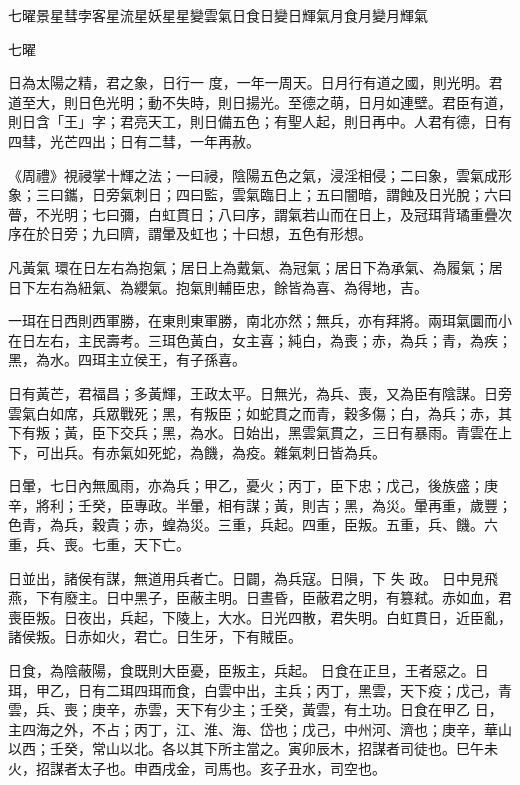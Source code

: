 
\begin{pinyinscope}

 七曜景星彗孛客星流星妖星星變雲氣日食日變日輝氣月食月變月輝氣



 七曜



 日為太陽之精，君之象，日行一
 度，一年一周天。日月行有道之國，則光明。君道至大，則日色光明；動不失時，則日揚光。至德之萌，日月如連壁。君臣有道，則日含「王」字；君亮天工，則日備五色；有聖人起，則日再中。人君有德，日有四彗，光芒四出；日有二彗，一年再赦。



 《周禮》視祲掌十輝之法；一曰祲，陰陽五色之氣，浸淫相侵；二曰象，雲氣成形象；三曰鑴，日旁氣刺日；四曰監，雲氣臨日上；五曰闇暗，謂蝕及日光脫；六曰瞢，不光明；七曰彌，白虹貫日；八曰序，謂氣若山而在日上，及冠珥背璚重疊次序在於日旁；九曰隮，謂暈及虹也；十曰想，五色有形想。



 凡黃氣
 環在日左右為抱氣；居日上為戴氣、為冠氣；居日下為承氣、為履氣；居日下左右為紐氣、為纓氣。抱氣則輔臣忠，餘皆為喜、為得地，吉。



 一珥在日西則西軍勝，在東則東軍勝，南北亦然；無兵，亦有拜將。兩珥氣圜而小在日左右，主民壽考。三珥色黃白，女主喜；純白，為喪；赤，為兵；青，為疾；黑，為水。四珥主立侯王，有子孫喜。



 日有黃芒，君福昌；多黃輝，王政太平。日無光，為兵、喪，又為臣有陰謀。日旁雲氣白如席，兵眾戰死；黑，有叛臣；如蛇貫之而青，穀多傷；白，為兵；赤，其下有叛；黃，臣下交兵；黑，為水。日始出，黑雲氣貫之，三日有暴雨。青雲在上下，可出兵。有赤氣如死蛇，為饑，為疫。雜氣刺日皆為兵。



 日暈，七日內無風雨，亦為兵；甲乙，憂火；丙丁，臣下忠；戊己，後族盛；庚辛，將利；壬癸，臣專政。半暈，相有謀；黃，則吉；黑，為災。暈再重，歲豐；色青，為兵，穀貴；赤，蝗為災。三重，兵起。四重，臣叛。五重，兵、饑。六重，兵、喪。七重，天下亡。



 日並出，諸侯有謀，無道用兵者亡。日闢，為兵寇。日隕，下
 失
 政。
 日中見飛燕，下有廢主。日中黑子，臣蔽主明。日晝昏，臣蔽君之明，有篡弒。赤如血，君喪臣叛。日夜出，兵起，下陵上，大水。日光四散，君失明。白虹貫日，近臣亂，諸侯叛。日赤如火，君亡。日生牙，下有賊臣。



 日食，為陰蔽陽，食既則大臣憂，臣叛主，兵起。
 日食在正旦，王者惡之。日珥，甲乙，日有二珥四珥而食，白雲中出，主兵；丙丁，黑雲，天下疫；戊己，青雲，兵、喪；庚辛，赤雲，天下有少主；壬癸，黃雲，有土功。日食在甲乙
 日，主四海之外，不占；丙丁，江、淮、海、岱也；戊己，中州河、濟也；庚辛，華山以西；壬癸，常山以北。各以其下所主當之。寅卯辰木，招謀者司徒也。巳午未火，招謀者太子也。申酉戌金，司馬也。亥子丑水，司空也。




\end{pinyinscope}
